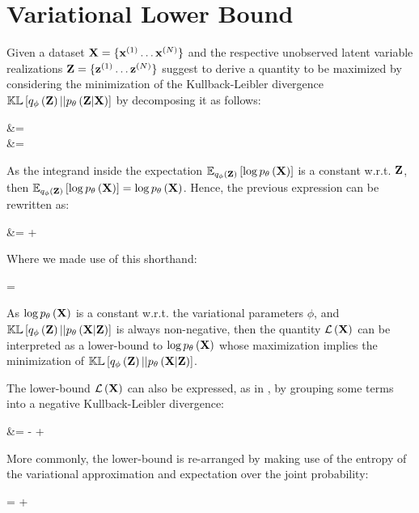\section{Variational Lower Bound}

Given a 
dataset $\mathbf{X} = \{\mathbf{x}^{(1)} \ldots \mathbf{x}^{(N)} \}$
and the respective unobserved latent variable realizations
$\mathbf{Z} = \{\mathbf{z}^{(1)} \ldots \mathbf{z}^{(N)}\}$
\cite{Fox2012}
suggest to derive a quantity to be maximized by considering the minimization
of the Kullback-Leibler divergence $\mathbb{KL}\left[ q_\phi\left(\mathbf{Z}\right) || p_\theta\left(\mathbf{Z}|\mathbf{X}\right) \right]$ by decomposing it as follows:

\begin{nalign}
\kl{\qphiZ}{\pZcond} &=
\expectqphiZ{\log \frac{\qphiZ}{\pZcond}}\\
&= \expectqphiZ{\log \qphiZ - \log \pXcond - \log \pZ + \log \pX}
\end{nalign}

As the integrand inside the expectation $\mathbb{E}_{q_\phi\left(\mathbf{Z}\right)}\left[ \log p_\theta\left(\mathbf{X}\right) \right]$ 
is a constant w.r.t. $\mathbf{Z}$, then $\mathbb{E}_{q_\phi\left(\mathbf{Z}\right)}\left[ \log p_\theta\left(\mathbf{X}\right) \right]=\log p_\theta\left(\mathbf{X}\right)$. Hence, the
previous expression can be rewritten as:

\begin{nalign}
\log \pX &= \kl{\qphiZ}{\pXcond}
+ \elboX
\end{nalign}

Where we made use of this shorthand:
\begin{nalign}
    \elboX = \expectqphiZ{-\log \qphiZ + \log \pXcond + \log \pZ}
\end{nalign}

As $\log p_\theta\left(\mathbf{X}\right)$ is a constant w.r.t. the variational parameters $\phi$,
and $\mathbb{KL}\left[ q_\phi\left(\mathbf{Z}\right) || p_\theta\left(\mathbf{X}|\mathbf{Z}\right) \right]$ is always non-negative,
then the quantity $\mathcal{L}\left(\mathbf{X}\right)$ can be interpreted as a lower-bound to $\log p_\theta\left(\mathbf{X}\right)$
whose maximization implies the minimization of $\mathbb{KL}\left[ q_\phi\left(\mathbf{Z}\right) || p_\theta\left(\mathbf{X}|\mathbf{Z}\right) \right]$.

The lower-bound $\mathcal{L}\left(\mathbf{X}\right)$ can also be expressed, as in \cite{1312.6114},
by grouping some terms
into a negative Kullback-Leibler divergence:
\begin{nalign}
\elboX 
&= -\kl{\qphiZ}{\pZ} + \expectqphiZ{\log \pXcond}
\end{nalign}

More commonly, the lower-bound is re-arranged by making use of
the entropy of the variational approximation
and expectation over the joint probability:

\begin{nalign}
\elboX = \entropy{\qphiZ} + \expectqphiZ{\log \pXZ}
\end{nalign}



